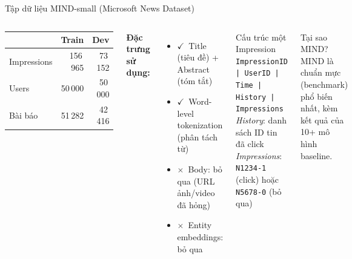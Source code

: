 \documentclass[aspectratio=169,11pt]{beamer}
\newcommand{\ok}{\textcolor{accentteal}{$\checkmark$}}
\newcommand{\bad}{\textcolor{warnred}{$\times$}}
\newcommand{\faDatabase}{{\color{ptitmid}\textbf{DB}}}
\begin{document}
\begin{frame}{Tập dữ liệu MIND-small (Microsoft News Dataset)}
  \begin{columns}[T]
      \begin{keybox}[title={\faDatabase\ Thống kê MIND-small}]
        \begin{tabular}{lrr}
          \toprule
          & \textbf{Train} & \textbf{Dev} \\
          \midrule
          Impressions & 156\,965 & 73\,152 \\
          Users & 50\,000 & 50\,000 \\
          Bài báo & 51\,282 & 42\,416 \\
          \bottomrule
        \end{tabular}
      \end{keybox}
      \vspace{0.5em}
      \textbf{Đặc trưng sử dụng:}
      \begin{itemize}
        \item \ok\ Title (tiêu đề) + Abstract (tóm tắt)
        \item \ok\ Word-level tokenization (phân tách từ)
        \item \bad\ Body: bỏ qua (URL ảnh/video đã hỏng)
        \item \bad\ Entity embeddings: bỏ qua
      \end{itemize}

      \begin{alertblock}{Cấu trúc một Impression}
        \footnotesize
        \texttt{ImpressionID | UserID |} \\
        \texttt{Time | History | Impressions}\\[0.4em]
        \textit{History}: danh sách ID tin đã click\\
        \textit{Impressions}: \texttt{N1234-1} (click)
        hoặc \texttt{N5678-0} (bỏ qua)
      \end{alertblock}
      \vspace{0.5em}
      \begin{exampleblock}{Tại sao MIND?}
        \footnotesize
        MIND là chuẩn mực (benchmark) phổ biến nhất, kèm
        kết quả của 10+ mô hình baseline.
      \end{exampleblock}
  \end{columns}
\end{frame}
\end{document}
